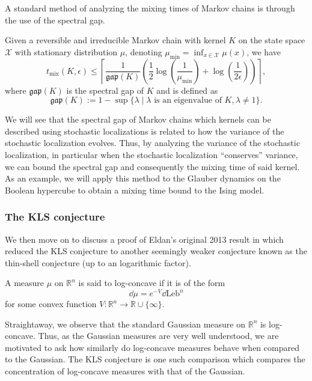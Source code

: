 A standard method of analyzing the mixing times of Markov chains is through the use of the spectral gap. 

\begin{theorem}\label{thm:levin}
  Given a reversible and irreducible Markov chain with kernel \(K\) on the state space \(\mathcal{X}\) 
  with stationary distribution \(\mu\), denoting \(\mu_{\min} = \inf_{x \in \mathcal{X}} \mu(x)\), we have 
  \[t_{\text{mix}}(K, \epsilon) \le \left\lceil\frac{1}{\mathfrak{gap}(K)}
  \left(\frac{1}{2}\log\left(\frac{1}{\mu_{\min}}\right) + \log\left(\frac{1}{2\epsilon}\right)\right)\right\rceil,\]
  where \(\mathfrak{gap}(K)\) is the spectral gap of \(K\) and is defined as
  \[\mathfrak{gap}(K) := 1 - \sup\{\lambda \mid \lambda \text{ is an eigenvalue of } K, \lambda \neq 1\}.\]
\end{theorem}

We will see that the spectral gap of Markov chains which kernels can be described using stochastic localizations 
is related to how the variance of the stochastic localization evolves. Thus, by analyzing the variance of 
the stochastic localization, in particular when the stochastic localization ``conserves'' variance, we can 
bound the spectral gap and consequently the mixing time of said kernel. As an example, we will apply this 
method to the Glauber dynamics on the Boolean hypercube to obtain a mixing time bound to the Ising model. 

\subsubsection{The KLS conjecture}

We then move on to discuss a proof of Eldan's original 2013 result in \cite{Eldan_2013} which reduced 
the KLS conjecture to another seemingly weaker conjecture known as the thin-shell conjecture (up to an logarithmic factor). 

\begin{definition}
  A measure \(\mu\) on \(\mathbb{R}^n\) is said to log-concave if it is of the form 
  \[\dd \mu = e^{-V}\dd\text{Leb}^n\] 
  for some convex function \(V : \mathbb{R}^n \to \mathbb{R} \cup \{\infty\}\).
\end{definition}

Straightaway, we observe that the standard Gaussian measure on \(\mathbb{R}^n\) is log-concave.
Thus, as the Gaussian measures are very well understood, we are motivated to ask how similarly do log-concave 
measures behave when compared to the Gaussian. The KLS conjecture is one such comparison which compares the 
concentration of log-concave measures with that of the Gaussian.

